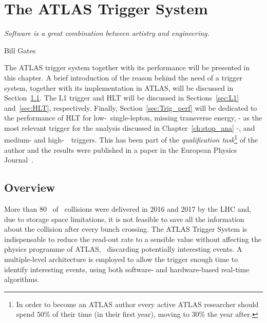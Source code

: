 \chapter{The ATLAS Trigger System}
\label{ch:trigger}
\epigraph{\emph{Software is a great combination between artistry and engineering.}}{Bill Gates}

	The \ac{ATLAS} trigger system together with its performance will be presented in this chapter. A brief introduction of the reason behind the need of a trigger system, together with its implementation in \ac{ATLAS}, will be discussed in Section~\ref{sec:Trig_intro}. The \ac{L1} trigger and \ac{HLT} will be discussed in Sections~\ref{sec:L1} and~\ref{sec:HLT}, respectively. Finally, Section~\ref{sec:Trig_perf} will be dedicated to the performance of \ac{HLT} for low-\pt\ single-lepton, missing transverse energy, \met - as the most relevant trigger for the analysis discussed in Chapter~\ref{ch:stop_ana} -, and medium- and high-\pt\ \bj\ triggers. This has been part of the \textit{qualification task}\footnote{In order to become an \ac{ATLAS} author every active \ac{ATLAS} researcher should spend $50\%$ of their time (in their first year), moving to $30\%$ the year after.} of the author and the results were published in a paper in the European Physics Journal~\cite{ATLASTrigger2015}.


	\section{Overview}
	\label{sec:Trig_intro}

		More than 80 \ifb\ of \pp\ collisions were delivered in 2016 and 2017 by the \ac{LHC} and, due to storage space limitations, it is not feasible to save all the information about the collision after every bunch crossing. The \ac{ATLAS} Trigger System is indispensable to reduce the read-out rate to a sensible value without affecting the physics programme of \ac{ATLAS}, \eg\ discarding potentially interesting events. A multiple-level architecture is employed to allow the trigger enough time to identify interesting events, using both software- and hardware-based real-time algorithms. 

